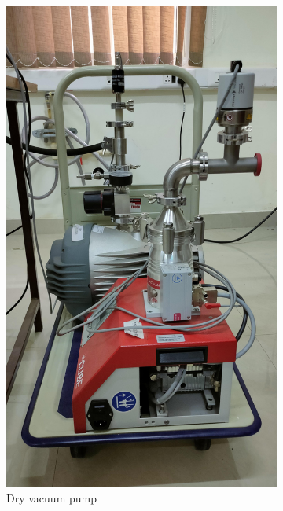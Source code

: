 \begin{figure}[H]
	\begin{minipage}{.45\linewidth}
		\begin{subfigure}[b]{0.7\textwidth}
			\centering
			\includegraphics[width=\textwidth]{figures/plcl2.jpg}
			\caption{Dry vacuum pump}
		\end{subfigure}
	\end{minipage}%
	\begin{subfigure}{0.45\textwidth}
		\centering

\end{subfigure}
\end{figure}
